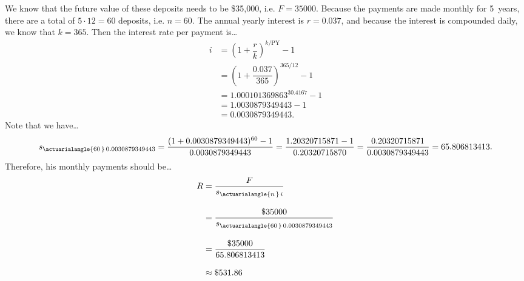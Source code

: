 \documentclass[11pt,letterpaper]{article}
\begin{document}
We know that the future value of these deposits needs to be \$35,000, i.e. $F= 35000$. Because the payments are made monthly for 5~years, there are a total of $5 \cdot 12= 60$ deposits, i.e. $n= 60$. The annual yearly interest is $r= 0.037$, and because the interest is compounded daily, we know that $k= 365$. Then the interest rate per payment is\dots 
	\[
	\begin{aligned}
	i&= \left( 1 + \dfrac{r}{k} \right)^{k/\text{PY}} - 1 \\[0.3cm]
	&= \left( 1 + \dfrac{0.037}{365} \right)^{365/12} - 1 \\[0.3cm]
	&= 1.000101369863^{30.4167} - 1 \\[0.3cm]
	&= 1.0030879349443 - 1 \\[0.3cm]
	&= 0.0030879349443.
	\end{aligned}
	\] \pspace
Note that we have\dots 
	\[
	s_{\actuarialangle{60\,}\, 0.0030879349443}= \dfrac{(1 + 0.0030879349443)^{60} - 1}{0.0030879349443}= \dfrac{1.20320715871 - 1}{0.20320715870}= \dfrac{0.20320715871}{0.0030879349443}= 65.806813413.
	\] \pspace
Therefore, his monthly payments should be\dots \pspace
	\[
	\begin{aligned}
	R&= \dfrac{F}{s_{\actuarialangle{n\,}\, i}} \\[0.3cm]
	&= \dfrac{\$35000}{s_{\actuarialangle{60\,}\, 0.0030879349443}} \\[0.3cm]
	&= \dfrac{\$35000}{65.806813413} \\[0.3cm]
	&\approx \$531.86
	\end{aligned}
	\] 
\end{document}
